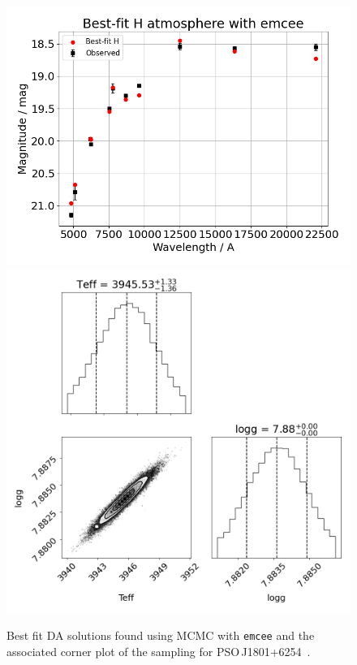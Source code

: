 \documentclass[fleqn,usenatbib]{rasti}
\begin{document}
\begin{figure}
    \centering
    \includegraphics[width=\columnwidth]{PSOJ1801p6254_emcee.png}
    \includegraphics[width=\columnwidth]{PSOJ1801p6254_emcee_corner.png}
    \caption{Best fit DA solutions found using MCMC with \texttt{emcee} and the associated corner plot of the
    sampling for PSO\,J1801+6254~\citep[][they found a spectroscopic of T$_\mathrm{eff}=3550$\,K]{2020MNRAS.493.6001L}.}
    \label{fig:best_fit}
\end{figure}
\end{document}
